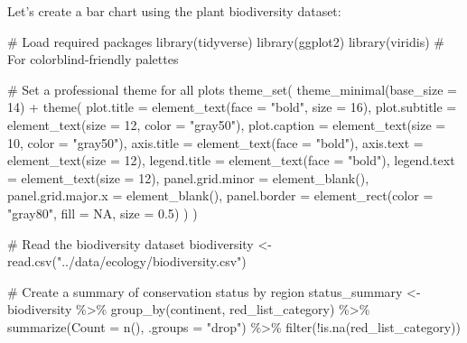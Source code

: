 \documentclass[
  letterpaper,
]{book}
\newenvironment{Shaded}{\begin{snugshade}}{\end{snugshade}}
\newcommand{\AttributeTok}[1]{\textcolor[rgb]{0.40,0.45,0.13}{#1}}
\newcommand{\CommentTok}[1]{\textcolor[rgb]{0.37,0.37,0.37}{#1}}
\newcommand{\ConstantTok}[1]{\textcolor[rgb]{0.56,0.35,0.01}{#1}}
\newcommand{\DecValTok}[1]{\textcolor[rgb]{0.68,0.00,0.00}{#1}}
\newcommand{\FloatTok}[1]{\textcolor[rgb]{0.68,0.00,0.00}{#1}}
\newcommand{\FunctionTok}[1]{\textcolor[rgb]{0.28,0.35,0.67}{#1}}
\newcommand{\NormalTok}[1]{\textcolor[rgb]{0.00,0.23,0.31}{#1}}
\newcommand{\OtherTok}[1]{\textcolor[rgb]{0.00,0.23,0.31}{#1}}
\newcommand{\SpecialCharTok}[1]{\textcolor[rgb]{0.37,0.37,0.37}{#1}}
\newcommand{\StringTok}[1]{\textcolor[rgb]{0.13,0.47,0.30}{#1}}
\begin{document}
Let's create a bar chart using the plant biodiversity dataset:

\begin{Shaded}
\begin{Highlighting}[]
\CommentTok{\# Load required packages}
\FunctionTok{library}\NormalTok{(tidyverse)}
\FunctionTok{library}\NormalTok{(ggplot2)}
\FunctionTok{library}\NormalTok{(viridis)  }\CommentTok{\# For colorblind{-}friendly palettes}

\CommentTok{\# Set a professional theme for all plots}
\FunctionTok{theme\_set}\NormalTok{(}
  \FunctionTok{theme\_minimal}\NormalTok{(}\AttributeTok{base\_size =} \DecValTok{14}\NormalTok{) }\SpecialCharTok{+}
  \FunctionTok{theme}\NormalTok{(}
    \AttributeTok{plot.title =} \FunctionTok{element\_text}\NormalTok{(}\AttributeTok{face =} \StringTok{"bold"}\NormalTok{, }\AttributeTok{size =} \DecValTok{16}\NormalTok{),}
    \AttributeTok{plot.subtitle =} \FunctionTok{element\_text}\NormalTok{(}\AttributeTok{size =} \DecValTok{12}\NormalTok{, }\AttributeTok{color =} \StringTok{"gray50"}\NormalTok{),}
    \AttributeTok{plot.caption =} \FunctionTok{element\_text}\NormalTok{(}\AttributeTok{size =} \DecValTok{10}\NormalTok{, }\AttributeTok{color =} \StringTok{"gray50"}\NormalTok{),}
    \AttributeTok{axis.title =} \FunctionTok{element\_text}\NormalTok{(}\AttributeTok{face =} \StringTok{"bold"}\NormalTok{),}
    \AttributeTok{axis.text =} \FunctionTok{element\_text}\NormalTok{(}\AttributeTok{size =} \DecValTok{12}\NormalTok{),}
    \AttributeTok{legend.title =} \FunctionTok{element\_text}\NormalTok{(}\AttributeTok{face =} \StringTok{"bold"}\NormalTok{),}
    \AttributeTok{legend.text =} \FunctionTok{element\_text}\NormalTok{(}\AttributeTok{size =} \DecValTok{12}\NormalTok{),}
    \AttributeTok{panel.grid.minor =} \FunctionTok{element\_blank}\NormalTok{(),}
    \AttributeTok{panel.grid.major.x =} \FunctionTok{element\_blank}\NormalTok{(),}
    \AttributeTok{panel.border =} \FunctionTok{element\_rect}\NormalTok{(}\AttributeTok{color =} \StringTok{"gray80"}\NormalTok{, }\AttributeTok{fill =} \ConstantTok{NA}\NormalTok{, }\AttributeTok{size =} \FloatTok{0.5}\NormalTok{)}
\NormalTok{  )}
\NormalTok{)}

\CommentTok{\# Read the biodiversity dataset}
\NormalTok{biodiversity }\OtherTok{\textless{}{-}} \FunctionTok{read.csv}\NormalTok{(}\StringTok{"../data/ecology/biodiversity.csv"}\NormalTok{)}

\CommentTok{\# Create a summary of conservation status by region}
\NormalTok{status\_summary }\OtherTok{\textless{}{-}}\NormalTok{ biodiversity }\SpecialCharTok{\%\textgreater{}\%}
  \FunctionTok{group\_by}\NormalTok{(continent, red\_list\_category) }\SpecialCharTok{\%\textgreater{}\%}
  \FunctionTok{summarize}\NormalTok{(}\AttributeTok{Count =} \FunctionTok{n}\NormalTok{(), }\AttributeTok{.groups =} \StringTok{"drop"}\NormalTok{) }\SpecialCharTok{\%\textgreater{}\%}
  \FunctionTok{filter}\NormalTok{(}\SpecialCharTok{!}\FunctionTok{is.na}\NormalTok{(red\_list\_category))}


\end{Highlighting}
\end{Shaded}
\end{document}
